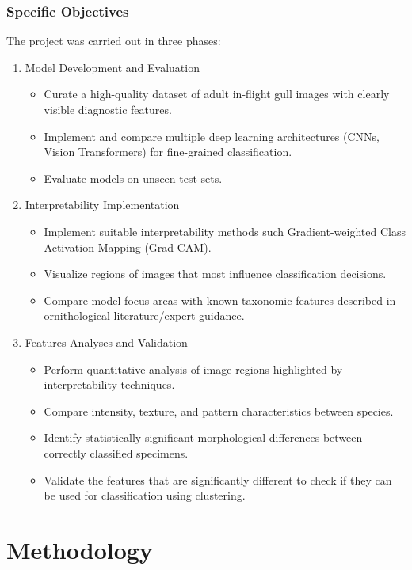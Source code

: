 \documentclass[a4paper,12pt]{report}
\begin{document}
\subsection*{Specific Objectives}
The project was carried out in three phases:
\begin{enumerate}
    \item Model Development and Evaluation
        \begin{itemize}
            \item Curate a high-quality dataset of adult in-flight gull images with clearly visible diagnostic features.
            \item Implement and compare multiple deep learning architectures (CNNs, Vision Transformers) for fine-grained classification.
            \item Evaluate models on unseen test sets.
        \end{itemize}
    \item Interpretability Implementation
        \begin{itemize}
            \item Implement suitable interpretability methods such Gradient-weighted Class Activation Mapping (Grad-CAM).
            \item Visualize regions of images that most influence classification decisions.
            \item Compare model focus areas with known taxonomic features described in ornithological literature/expert guidance.
        \end{itemize}
    \item Features Analyses and Validation
        \begin{itemize}
            \item Perform quantitative analysis of image regions highlighted by interpretability techniques.
            \item Compare intensity, texture, and pattern characteristics between species.
            \item Identify statistically significant morphological differences between correctly classified specimens.
            \item Validate the features that are significantly different to check if they can be used for classification using clustering.
        \end{itemize}
\end{enumerate}

\newpage
\chapter{Methodology}
\end{document}
